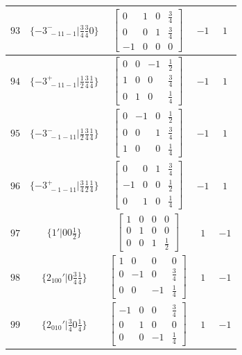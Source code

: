 \documentclass[fleqn,8pt]{jsarticle}
\begin{document}
\begin{longtable}{ccccc}
$ 93 $ & $ \{-3^{-}_{\,\,-11-1}|\frac{3}{4} \frac{3}{4} 0\} $ & $ \begin{bmatrix} 0 & 1 & 0 & \frac{3}{4} \\ 0 & 0 & 1 & \frac{3}{4} \\ -1 & 0 & 0 & 0 \end{bmatrix} $ & $ -1 $ & $ 1 $ \\ \hline
$ 94 $ & $ \{-3^{+}_{\,\,-11-1}|\frac{1}{2} \frac{3}{4} \frac{1}{4}\} $ & $ \begin{bmatrix} 0 & 0 & -1 & \frac{1}{2} \\ 1 & 0 & 0 & \frac{3}{4} \\ 0 & 1 & 0 & \frac{1}{4} \end{bmatrix} $ & $ -1 $ & $ 1 $ \\ \hline
$ 95 $ & $ \{-3^{-}_{\,\,-1-11}|\frac{1}{2} \frac{3}{4} \frac{1}{4}\} $ & $ \begin{bmatrix} 0 & -1 & 0 & \frac{1}{2} \\ 0 & 0 & 1 & \frac{3}{4} \\ 1 & 0 & 0 & \frac{1}{4} \end{bmatrix} $ & $ -1 $ & $ 1 $ \\ \hline
$ 96 $ & $ \{-3^{+}_{\,\,-1-11}|\frac{3}{4} \frac{1}{2} \frac{1}{4}\} $ & $ \begin{bmatrix} 0 & 0 & 1 & \frac{3}{4} \\ -1 & 0 & 0 & \frac{1}{2} \\ 0 & 1 & 0 & \frac{1}{4} \end{bmatrix} $ & $ -1 $ & $ 1 $ \\ \hline
$ 97 $ & $ \{1{}'|0 0 \frac{1}{2}\} $ & $ \begin{bmatrix} 1 & 0 & 0 & 0 \\ 0 & 1 & 0 & 0 \\ 0 & 0 & 1 & \frac{1}{2} \end{bmatrix} $ & $ 1 $ & $ -1 $ \\ \hline
$ 98 $ & $ \{2{}_{100}{}'|0 \frac{3}{4} \frac{1}{4}\} $ & $ \begin{bmatrix} 1 & 0 & 0 & 0 \\ 0 & -1 & 0 & \frac{3}{4} \\ 0 & 0 & -1 & \frac{1}{4} \end{bmatrix} $ & $ 1 $ & $ -1 $ \\ \hline
$ 99 $ & $ \{2{}_{010}{}'|\frac{3}{4} 0 \frac{1}{4}\} $ & $ \begin{bmatrix} -1 & 0 & 0 & \frac{3}{4} \\ 0 & 1 & 0 & 0 \\ 0 & 0 & -1 & \frac{1}{4} \end{bmatrix} $ & $ 1 $ & $ -1 $ \\ \hline

\end{longtable}
\end{document}
